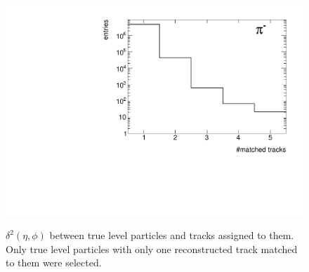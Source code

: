 \begin{figure}[hb]
{		\includegraphics[width=\linewidth,page=30]{graphics/eff/trackSplitting_CD.pdf}\\
	}%
	\caption[$\delta^{2}\left(\eta,\phi\right)$ between true level particles and tracks assigned to them.]{$\delta^{2}\left(\eta,\phi\right)$ between true level particles and tracks assigned to them. Only true level particles with only one reconstructed track matched to them were selected.}\label{fig:trackSplittingNominalDelta_1}
\end{figure}

